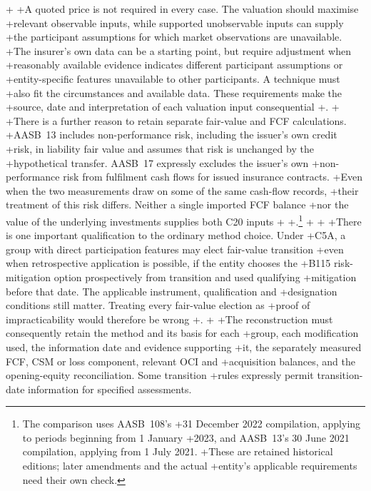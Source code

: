 +
+A quoted price is not required in every case. The valuation should maximise
+relevant observable inputs, while supported unobservable inputs can supply
+the participant assumptions for which market observations are unavailable.
+The insurer's own data can be a starting point, but require adjustment when
+reasonably available evidence indicates different participant assumptions or
+entity-specific features unavailable to other participants. A technique must
+also fit the circumstances and available data. These requirements make the
+source, date and interpretation of each valuation input consequential
+\citep[paragraphs~61--67 and 87--89]{aasb13comp2021}.
+
+There is a further reason to retain separate fair-value and FCF calculations.
+AASB~13 includes non-performance risk, including the issuer's own credit
+risk, in liability fair value and assumes that risk is unchanged by the
+hypothetical transfer. AASB~17 expressly excludes the issuer's own
+non-performance risk from fulfilment cash flows for issued insurance contracts.
+Even when the two measurements draw on some of the same cash-flow records,
+their treatment of this risk differs. Neither a single imported FCF balance
+nor the value of the underlying investments supplies both C20 inputs
+\citep[paragraphs~42--44]{aasb13comp2021}
+\citep[paragraph~31]{aasb17}.\footnote{The comparison uses AASB~108's
+31 December 2022 compilation, applying to periods beginning from 1 January
+2023, and AASB~13's 30 June 2021 compilation, applying from 1 July 2021.
+These are retained historical editions; later amendments and the actual
+entity's applicable requirements need their own check.}
+
+\clearpage
+There is one important qualification to the ordinary method choice. Under
+C5A, a group with direct participation features may elect fair-value transition
+even when retrospective application is possible, if the entity chooses the
+B115 risk-mitigation option prospectively from transition and used qualifying
+mitigation before that date. The applicable instrument, qualification and
+designation conditions still matter. Treating every fair-value election as
+proof of impracticability would therefore be wrong
+\citep[paragraphs C3(b), C5A and B115--B118]{aasb17}.
+
+The reconstruction must consequently retain the method and its basis for each
+group, each modification used, the information date and evidence supporting
+it, the separately measured FCF, CSM or loss component, relevant OCI and
+acquisition balances, and the opening-equity reconciliation. Some transition
+rules expressly permit transition-date information for specified assessments.
